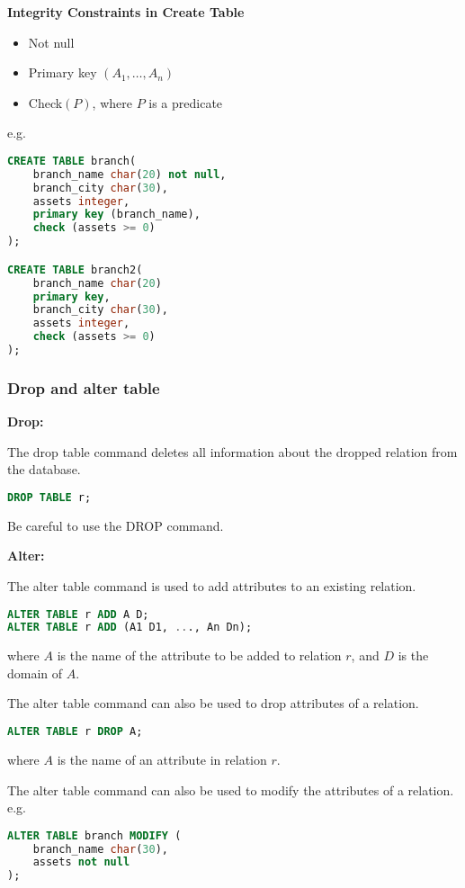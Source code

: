 \textbf{Integrity Constraints in Create Table}
\begin{itemize}
    \item Not null
    \item Primary key $(A_1, \dots, A_n)$
    \item Check$(P)$, where $P$ is a predicate
\end{itemize}

e.g. 
\begin{lstlisting}[language=sql]
CREATE TABLE branch(
    branch_name char(20) not null,
    branch_city char(30),
    assets integer,
    primary key (branch_name),
    check (assets >= 0)
);

CREATE TABLE branch2(
    branch_name char(20)
    primary key,
    branch_city char(30),
    assets integer,
    check (assets >= 0)
);
\end{lstlisting}


\subsubsection{Drop and alter table}
\textbf{Drop:}

The drop table command deletes all information about the dropped relation from the database. 
\begin{lstlisting}[language=sql]
DROP TABLE r;
\end{lstlisting}
Be careful to use the DROP command. 

\textbf{Alter:}

The alter table command is used to add attributes to an existing relation.
\begin{lstlisting}[language=sql]
ALTER TABLE r ADD A D;
ALTER TABLE r ADD (A1 D1, ..., An Dn);
\end{lstlisting}
where $A$ is the name of the attribute to be added to relation $r$, and $D$ is the domain of $A$.

The alter table command can also be used to drop attributes of a relation. 
\begin{lstlisting}[language=sql]
ALTER TABLE r DROP A;
\end{lstlisting}
where $A$ is the name of an attribute in relation $r$.

The alter table command can also be used to modify the attributes of a relation. e.g. 
\begin{lstlisting}[language=sql]
ALTER TABLE branch MODIFY (
    branch_name char(30), 
    assets not null
);
\end{lstlisting}

